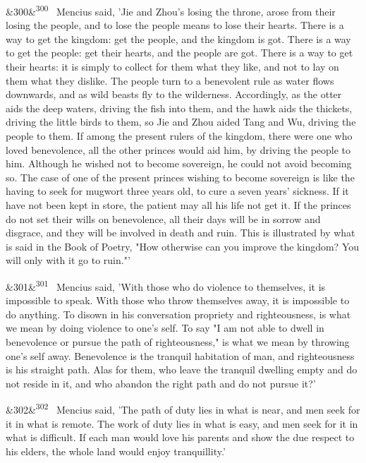 \documentclass[12pt]{article}
\newcommand{\para}[1][]{\par\noindent\ifx&#1&\else\textsuperscript{\footnotesize #1}~\fi}
\begin{document}
\para[300] Mencius said, 'Jie and Zhou's losing the throne, arose from their losing the people, and to lose the people means to lose their hearts. There is a way to get the kingdom: get the people, and the kingdom is got. There is a way to get the people: get their hearts, and the people are got. There is a way to get their hearts: it is simply to collect for them what they like, and not to lay on them what they dislike. The people turn to a benevolent rule as water flows downwards, and as wild beasts fly to the wilderness. Accordingly, as the otter aids the deep waters, driving the fish into them, and the hawk aids the thickets, driving the little birds to them, so Jie and Zhou aided Tang and Wu, driving the people to them. If among the present rulers of the kingdom, there were one who loved benevolence, all the other princes would aid him, by driving the people to him. Although he wished not to become sovereign, he could not avoid becoming so. The case of one of the present princes wishing to become sovereign is like the having to seek for mugwort three years old, to cure a seven years' sickness. If it have not been kept in store, the patient may all his life not get it. If the princes do not set their wills on benevolence, all their days will be in sorrow and disgrace, and they will be involved in death and ruin. This is illustrated by what is said in the Book of Poetry, "How otherwise can you improve the kingdom? You will only with it go to ruin."'

\para[301] Mencius said, 'With those who do violence to themselves, it is impossible to speak. With those who throw themselves away, it is impossible to do anything. To disown in his conversation propriety and righteousness, is what we mean by doing violence to one's self. To say "I am not able to dwell in benevolence or pursue the path of righteousness," is what we mean by throwing one's self away. Benevolence is the tranquil habitation of man, and righteousness is his straight path. Alas for them, who leave the tranquil dwelling empty and do not reside in it, and who abandon the right path and do not pursue it?'

\para[302] Mencius said, 'The path of duty lies in what is near, and men seek for it in what is remote. The work of duty lies in what is easy, and men seek for it in what is difficult. If each man would love his parents and show the due respect to his elders, the whole land would enjoy tranquillity.'
\end{document}
